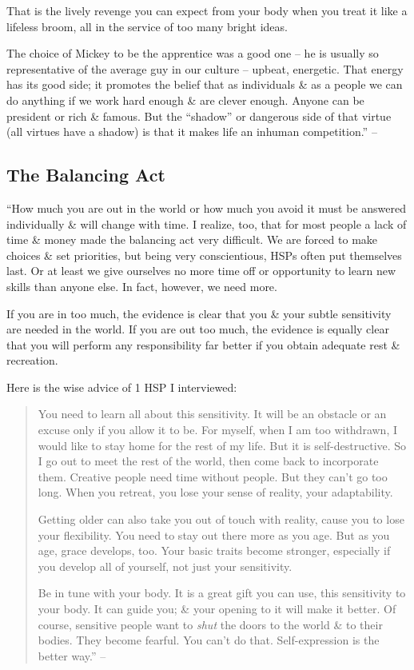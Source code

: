 \documentclass{article}
\numberwithin{equation}{section}
\begin{document}
That is the lively revenge you can expect from your body when you treat it like a lifeless broom, all in the service of too many bright ideas.

The choice of Mickey to be the apprentice was a good one -- he is usually so representative of the average guy in our culture -- upbeat, energetic. That energy has its good side; it promotes the belief that as individuals \& as a people we can do anything if we work hard enough \& are clever enough. Anyone can be president or rich \& famous. But the ``shadow'' or dangerous side of that virtue (all virtues have a shadow) is that it makes life an inhuman competition.'' -- \cite[pp. 85--87]{Aron2013}

\subsection{The Balancing Act}
``How much you are out in the world or how much you avoid it must be answered individually \& will change with time. I realize, too, that for most people a lack of time \& money made the balancing act very difficult. We are forced to make choices \& set priorities, but being very conscientious, HSPs often put themselves last. Or at least we give ourselves no more time off or opportunity to learn new skills than anyone else. In fact, however, we need more.

If you are in too much, the evidence is clear that you \& your subtle sensitivity are needed in the world. If you are out too much, the evidence is equally clear that you will perform any responsibility far better if you obtain adequate rest \& recreation.

Here is the wise advice of 1 HSP I interviewed:
\begin{quotation}
	You need to learn all about this sensitivity. It will be an obstacle or an excuse only if you allow it to be. For myself, when I am too withdrawn, I would like to stay home for the rest of my life. But it is self-destructive. So I go out to meet the rest of the world, then come back to incorporate them. Creative people need time without people. But they can't go too long. When you retreat, you lose your sense of reality, your adaptability.
	
	Getting older can also take you out of touch with reality, cause you to lose your flexibility. You need to stay out there more as you age. But as you age, grace develops, too. Your basic traits become stronger, especially if you develop all of yourself, not just your sensitivity.
	
	Be in tune with your body. It is a great gift you can use, this sensitivity to your body. It can guide you; \& your opening to it will make it better. Of course, sensitive people want to \textit{shut} the doors to the world \& to their bodies. They become fearful. You can't do that. Self-expression is the better way.'' -- \cite[pp. 87--88]{Aron2013}
\end{quotation}
\end{document}
